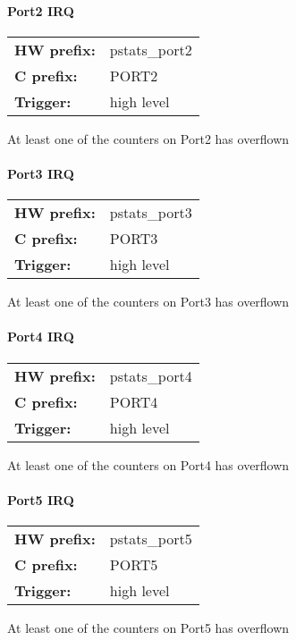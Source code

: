 \paragraph*{Port2 IRQ}\vspace{12pt}
\begin{small}
\begin{tabular}{l l }
{\bf HW prefix:}  & pstats\_port2\\
{\bf C prefix:}  & PORT2\\
{\bf Trigger:}  & high level\\
\end{tabular}

\end{small}
\vspace{12pt}
At least one of the counters on Port2 has overflown
\paragraph*{Port3 IRQ}\vspace{12pt}
\begin{small}
\begin{tabular}{l l }
{\bf HW prefix:}  & pstats\_port3\\
{\bf C prefix:}  & PORT3\\
{\bf Trigger:}  & high level\\
\end{tabular}

\end{small}
\vspace{12pt}
At least one of the counters on Port3 has overflown
\paragraph*{Port4 IRQ}\vspace{12pt}
\begin{small}
\begin{tabular}{l l }
{\bf HW prefix:}  & pstats\_port4\\
{\bf C prefix:}  & PORT4\\
{\bf Trigger:}  & high level\\
\end{tabular}

\end{small}
\vspace{12pt}
At least one of the counters on Port4 has overflown
\paragraph*{Port5 IRQ}\vspace{12pt}
\begin{small}
\begin{tabular}{l l }
{\bf HW prefix:}  & pstats\_port5\\
{\bf C prefix:}  & PORT5\\
{\bf Trigger:}  & high level\\
\end{tabular}

\end{small}
\vspace{12pt}
At least one of the counters on Port5 has overflown
